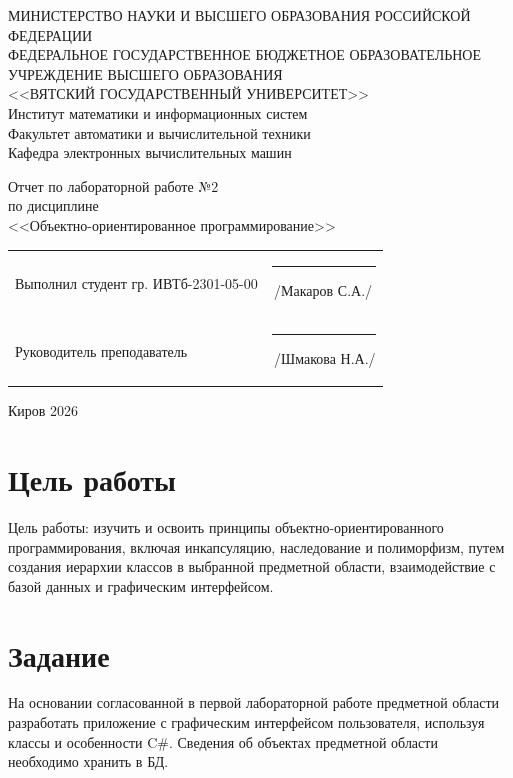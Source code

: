 \documentclass[a4paper,14pt]{extarticle}
\begin{document}
\newpage\thispagestyle{empty}
\begin{center}
  \MakeUppercase{
    Министерство науки и высшего образования Российской Федерации\\
    Федеральное государственное бюджетное образовательное учреждение высшего образования\\
    <<Вятский Государственный Университет>>\\
  }
  Институт математики и информационных систем\\
  Факультет автоматики и вычислительной техники\\
  Кафедра электронных вычислительных машин
\end{center}
\vfill

\begin{center}
  Отчет по лабораторной работе №2\\
  по дисциплине\\
  <<Объектно-ориентированное программирование>>\\
\end{center}
\vfill

\noindent
\begin{tabular}{ll}
  Выполнил студент гр. ИВТб-2301-05-00 \hspace{5mm} & \rule[-1mm]{25mm}{0.10mm}\,/Макаров С.А./ \\
  Руководитель преподаватель                        & \rule[-1mm]{25mm}{0.10mm}\,/Шмакова Н.А./ \\
\end{tabular}

\vfill
\begin{center}
  Киров 2026
\end{center}

\newpage
\section*{\hspace{12.5mm}Цель работы}
Цель работы: изучить и освоить принципы объектно-ориентированного программирования, включая инкапсуляцию, наследование и полиморфизм, путем создания иерархии классов в выбранной предметной области, взаимодействие с базой данных и графическим интерфейсом.

\section*{\hspace{12.5mm}Задание}
На основании согласованной в первой лабораторной работе предметной области разработать приложение с  графическим интерфейсом пользователя, используя классы и особенности C\#. Сведения  об объектах предметной области необходимо хранить в БД.
\end{document}
